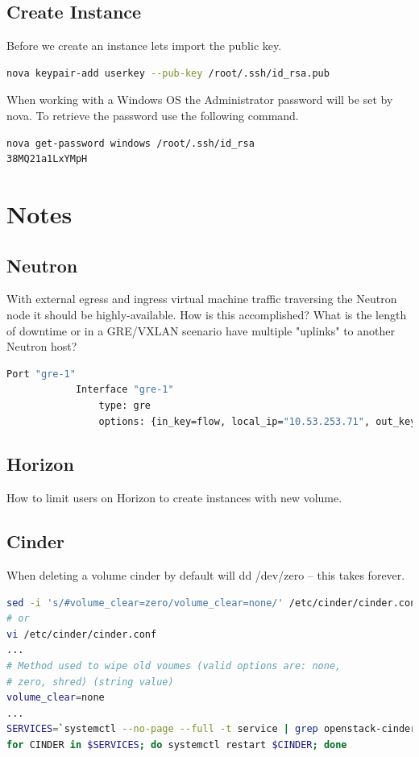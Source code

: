 \documentclass[11pt,letterpaper,oneside]{book}
\begin{document}
\section{Create Instance}
Before we create an instance lets import the public key.
\begin{lstlisting}[caption={Add public key},language=bash]
nova keypair-add userkey --pub-key /root/.ssh/id_rsa.pub
\end{lstlisting}
When working with a Windows OS the Administrator password will be set by nova.  To retrieve the password use the following command. 
\begin{lstlisting}[caption={Windows administrator password},language=bash]
nova get-password windows /root/.ssh/id_rsa 
38MQ21a1LxYMpH
\end{lstlisting}
\appendix
\chapter{Notes}
\section{Neutron}
With external egress and ingress virtual machine traffic traversing the Neutron node it should be highly-available.  How is this accomplished?  What is the length of downtime or in a GRE/VXLAN scenario have multiple "uplinks" to another Neutron host? 
\begin{lstlisting}[language=bash]
Port "gre-1"
            Interface "gre-1"
                type: gre
                options: {in_key=flow, local_ip="10.53.253.71", out_key=flow, remote_ip="10.53.253.101"}
\end{lstlisting}
\section{Horizon}
How to limit users on Horizon to create instances with new volume.
\section{Cinder}
When deleting a volume cinder by default will dd /dev/zero – this takes forever.
\begin{lstlisting}[caption={Change Cinder volume clear},language=bash]
sed -i 's/#volume_clear=zero/volume_clear=none/' /etc/cinder/cinder.conf
# or
vi /etc/cinder/cinder.conf
...
# Method used to wipe old voumes (valid options are: none, 
# zero, shred) (string value) 
volume_clear=none
...
SERVICES=`systemctl --no-page --full -t service | grep openstack-cinder | awk '{print $1}'` 
for CINDER in $SERVICES; do systemctl restart $CINDER; done
\end{lstlisting}
\end{document}
